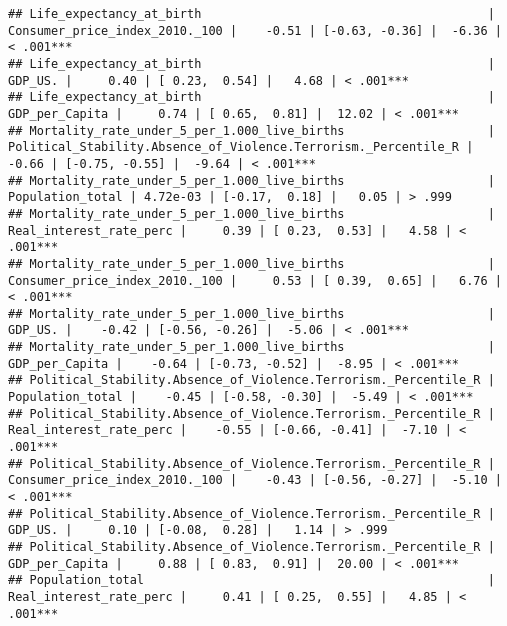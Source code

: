\documentclass[
]{article}
\begin{document}
\begin{verbatim}
## Life_expectancy_at_birth                                        |                                  Consumer_price_index_2010._100 |    -0.51 | [-0.63, -0.36] |  -6.36 | < .001***
## Life_expectancy_at_birth                                        |                                                         GDP_US. |     0.40 | [ 0.23,  0.54] |   4.68 | < .001***
## Life_expectancy_at_birth                                        |                                                  GDP_per_Capita |     0.74 | [ 0.65,  0.81] |  12.02 | < .001***
## Mortality_rate_under_5_per_1.000_live_births                    | Political_Stability.Absence_of_Violence.Terrorism._Percentile_R |    -0.66 | [-0.75, -0.55] |  -9.64 | < .001***
## Mortality_rate_under_5_per_1.000_live_births                    |                                                Population_total | 4.72e-03 | [-0.17,  0.18] |   0.05 | > .999   
## Mortality_rate_under_5_per_1.000_live_births                    |                                         Real_interest_rate_perc |     0.39 | [ 0.23,  0.53] |   4.58 | < .001***
## Mortality_rate_under_5_per_1.000_live_births                    |                                  Consumer_price_index_2010._100 |     0.53 | [ 0.39,  0.65] |   6.76 | < .001***
## Mortality_rate_under_5_per_1.000_live_births                    |                                                         GDP_US. |    -0.42 | [-0.56, -0.26] |  -5.06 | < .001***
## Mortality_rate_under_5_per_1.000_live_births                    |                                                  GDP_per_Capita |    -0.64 | [-0.73, -0.52] |  -8.95 | < .001***
## Political_Stability.Absence_of_Violence.Terrorism._Percentile_R |                                                Population_total |    -0.45 | [-0.58, -0.30] |  -5.49 | < .001***
## Political_Stability.Absence_of_Violence.Terrorism._Percentile_R |                                         Real_interest_rate_perc |    -0.55 | [-0.66, -0.41] |  -7.10 | < .001***
## Political_Stability.Absence_of_Violence.Terrorism._Percentile_R |                                  Consumer_price_index_2010._100 |    -0.43 | [-0.56, -0.27] |  -5.10 | < .001***
## Political_Stability.Absence_of_Violence.Terrorism._Percentile_R |                                                         GDP_US. |     0.10 | [-0.08,  0.28] |   1.14 | > .999   
## Political_Stability.Absence_of_Violence.Terrorism._Percentile_R |                                                  GDP_per_Capita |     0.88 | [ 0.83,  0.91] |  20.00 | < .001***
## Population_total                                                |                                         Real_interest_rate_perc |     0.41 | [ 0.25,  0.55] |   4.85 | < .001***

\end{verbatim}
\end{document}
